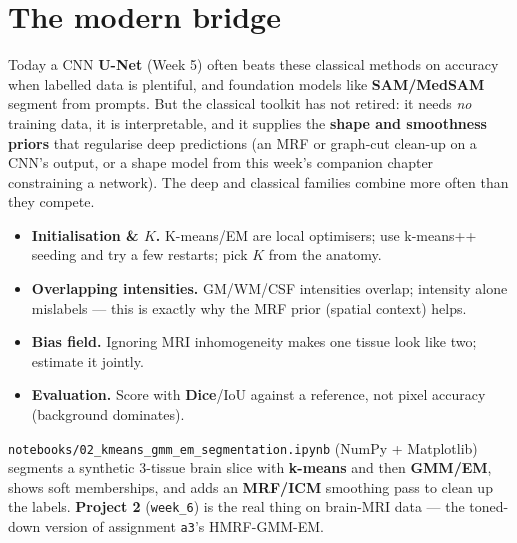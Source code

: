 \documentclass[11pt]{article}
\begin{document}
\section{The modern bridge}

Today a CNN \textbf{U-Net} (Week 5) often beats these classical methods on
accuracy when labelled data is plentiful, and foundation models like
\textbf{SAM/MedSAM} segment from prompts. But the classical toolkit has not
retired: it needs \emph{no} training data, it is interpretable, and it supplies
the \textbf{shape and smoothness priors} that regularise deep predictions (an MRF
or graph-cut clean-up on a CNN's output, or a shape model from this week's
companion chapter constraining a network). The deep and classical families
combine more often than they compete.

\begin{notebox}
\begin{itemize}[nosep,leftmargin=*]
  \item \textbf{Initialisation \& $K$.} K-means/EM are local optimisers; use
  k-means++ seeding and try a few restarts; pick $K$ from the anatomy.
  \item \textbf{Overlapping intensities.} GM/WM/CSF intensities overlap; intensity
  alone mislabels --- this is exactly why the MRF prior (spatial context) helps.
  \item \textbf{Bias field.} Ignoring MRI inhomogeneity makes one tissue look like
  two; estimate it jointly.
  \item \textbf{Evaluation.} Score with \textbf{Dice}/IoU against a reference, not
  pixel accuracy (background dominates).
\end{itemize}
\end{notebox}

\begin{keybox}
\texttt{notebooks/02\_kmeans\_gmm\_em\_segmentation.ipynb} (NumPy + Matplotlib)
segments a synthetic 3-tissue brain slice with \textbf{k-means} and then
\textbf{GMM/EM}, shows soft memberships, and adds an \textbf{MRF/ICM} smoothing
pass to clean up the labels. \textbf{Project 2} (\texttt{week\_6}) is the real
thing on brain-MRI data --- the toned-down version of assignment \texttt{a3}'s
HMRF-GMM-EM.
\end{keybox}

\end{document}
